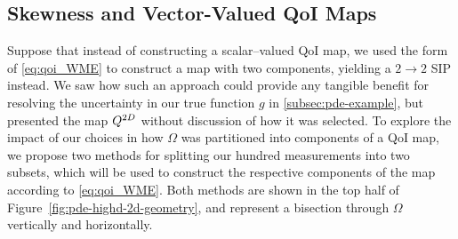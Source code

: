 \FloatBarrier
\subsection{Skewness and Vector-Valued QoI Maps}

Suppose that instead of constructing a scalar--valued QoI map, we used the form of \eqref{eq:qoi_WME} to construct a map with two components, yielding a $2 \rightarrow 2$ SIP instead.
We saw how such an approach could provide any tangible benefit for resolving the uncertainty in our true function $g$ in \ref{subsec:pde-example}, but presented the map $Q^{2D}$ without discussion of how it was selected.
To explore the impact of our choices in how $\Omega$ was partitioned into components of a QoI map, we propose two methods for splitting our hundred measurements into two subsets, which will be used to construct the respective components of the map according to \eqref{eq:qoi_WME}.
Both methods are shown in the top half of Figure~\ref{fig:pde-highd-2d-geometry}, and represent a bisection through $\Omega$ vertically and horizontally.

